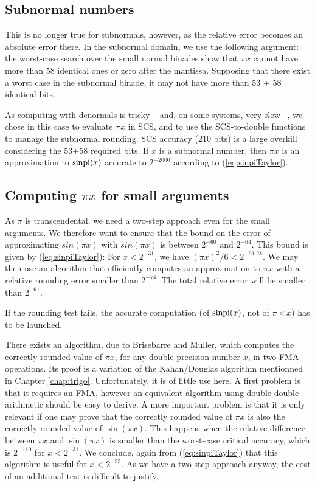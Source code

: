 \subsection{Subnormal numbers}
This is no longer true for subnormals, however, as the relative error
becomes an absolute error there. In the subnormal domain, we use the
following argument: the worst-case search over the small normal
binades show that $\pi x$ cannot have more than 58 identical ones or
zero after the mantissa.  Supposing that there exist a worst case in
the subnormal binade, it may not have more than 53 + 58 identical
bits.

As computing with denormals is tricky -- and, on some systems, very
slow --, we chose in this case to evaluate $\pi x$ in SCS, and to use
the SCS-to-double functions to manage the subnormal rounding. SCS
accuracy (210 bits) is a large overkill considering the 53+58 required
bits. If $x$ is a subnormal number, then $\pi x$ is an approximation to
$\operatorname{sinpi}(x)$ accurate to $2^{-2000}$ according to
(\ref{eq:sinpiTaylor}). 



\subsection{Computing $\pi x$ for small arguments}
As $\pi$ is transcendental, we need a two-step approach even for the
small arguments.  We therefore want to ensure that the bound on the
error of approximating $sin(\pi x)$ with $sin(\pi x)$ is between
$2^{-60}$ and $2^{-64}$.  This bound is given by
(\ref{eq:sinpiTaylor}): For $x<2^{-31}$, we have $(\pi x)^2/6
<2^{-61.28}$.  We may then use an algorithm that efficiently computes
an approximation to $\pi x$ with a relative rounding error smaller
than $2^{-74}$. The total relative error will be smaller than
$2^{-61}$.

If the rounding test fails, the accurate computation (of $\operatorname{sinpi}(x)$,
not of $\pi\times x$) has to be launched.

There exists an algorithm, due to Brisebarre and Muller, which
computes the correctly rounded value of $\pi x$, for any
double-precision number $x$, in two FMA operations.  Its proof is a
variation of the Kahan/Douglas algorithm mentionned in Chapter
\ref{chap:trigo}. Unfortunately, it is of little use here. A first
problem is that it requires an FMA, however an equivalent algorithm
using double-double arithmetic should be easy to derive. A more
important problem is that it is only relevant if one may prove that
the correctly rounded value of $\pi x$ is also the correctly rounded
value of $\sin(\pi x)$. This happens when the relative difference
between $\pi x$ and $\sin(\pi x)$ is smaller than the worst-case
critical accuracy, which is $2^{-110}$ for
$x<2^{-31}$. We conclude, again from (\ref{eq:sinpiTaylor}) that this
algorithm is useful for $x<2^{-55}$.
As we have a two-step approach anyway, the cost of an additional test
is difficult to justify. 

